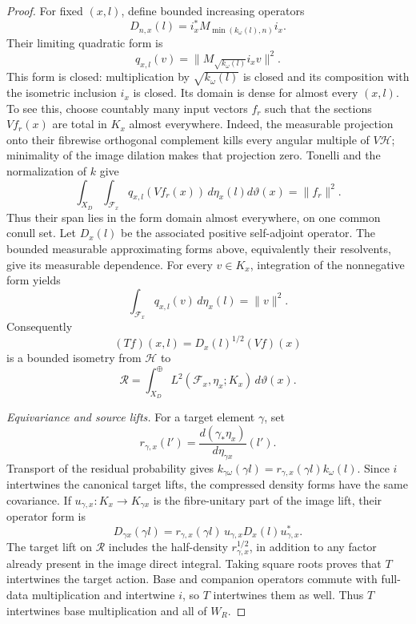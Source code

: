 \begin{proof}
For fixed \((x,l)\), define bounded increasing operators
\[
 D_{n,x}(l)=i_x^*M_{\min(k_\omega(l),n)}i_x.
\]
Their limiting quadratic form is
\[
 q_{x,l}(v)=\|M_{\sqrt{k_\omega(l)}}i_xv\|^2.
\]
This form is closed: multiplication by
\(\sqrt{k_\omega(l)}\) is closed and its composition with the
isometric inclusion \(i_x\) is closed. Its domain is dense for
almost every \((x,l)\). To see this, choose countably many
input vectors \(f_r\) such that the sections \(Vf_r(x)\) are
total in \(K_x\) almost everywhere. Indeed, the measurable projection
onto their fibrewise orthogonal complement kills every angular
multiple of \(V\mathcal H\); minimality of the image dilation makes
that projection zero.
Tonelli and the normalization of \(k\) give
\[
 \int_{X_D}\int_{\mathcal F_x}
        q_{x,l}(Vf_r(x))\,d\eta_x(l)d\vartheta(x)
          =\|f_r\|^2.
\]
Thus their span lies in the form domain almost everywhere, on
one common conull set. Let \(D_x(l)\) be the associated positive
self-adjoint operator. The bounded measurable approximating
forms above, equivalently their resolvents, give its measurable
dependence. For every \(v\in K_x\), integration of the
nonnegative form yields
\[
 \int_{\mathcal F_x}q_{x,l}(v)\,d\eta_x(l)=\|v\|^2.
\]
Consequently
\begin{equation}
 (Tf)(x,l)=D_x(l)^{1/2}(Vf)(x)
 \label{eq:links-density-isometry}
\end{equation}
is a bounded isometry from \(\mathcal H\) to
\[
 \mathcal R=
 \int_{X_D}^{\oplus}L^2(\mathcal F_x,\eta_x;K_x)\,d\vartheta(x).
\]

\emph{Equivariance and source lifts.}
For a target element \(\gamma\), set
\[
 r_{\gamma,x}(l')=
       \frac{d(\gamma_*\eta_x)}{d\eta_{\gamma x}}(l').
\]
Transport of the residual probability gives
\(k_{\gamma\omega}(\gamma l)
  =r_{\gamma,x}(\gamma l)k_\omega(l)\).
Since \(i\) intertwines the canonical target lifts, the
compressed density forms have the same covariance. If
\(u_{\gamma,x}:K_x\to K_{\gamma x}\) is the fibre-unitary
part of the image lift, their operator form is
\[
 D_{\gamma x}(\gamma l)
   =r_{\gamma,x}(\gamma l)\,
            u_{\gamma,x}D_x(l)u_{\gamma,x}^*.
\]
The target lift on \(\mathcal R\) includes the half-density
\(r_{\gamma,x}^{1/2}\), in addition to any factor already
present in the image direct integral. Taking square roots proves
that \(T\) intertwines the target action. Base and companion
operators commute with full-data multiplication and intertwine
\(i\), so \(T\) intertwines them as well. Thus \(T\)
intertwines base multiplication and all of \(W_R\).


\end{proof}
